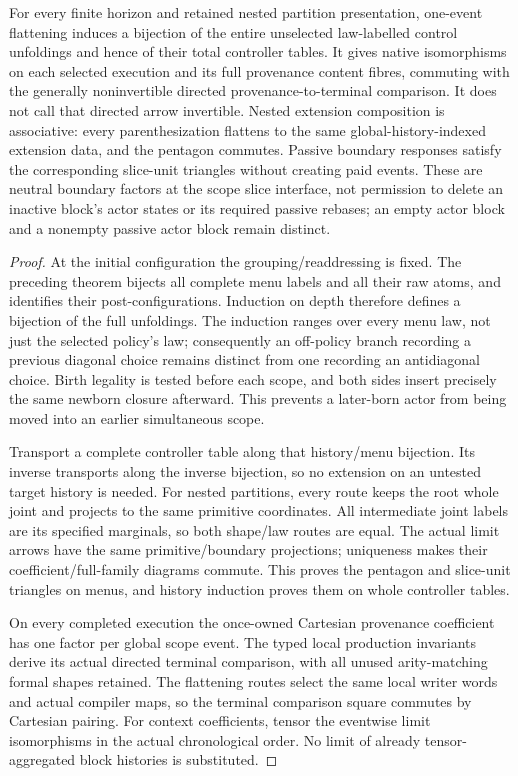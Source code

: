 \documentclass[11pt]{article}
\begin{document}
\begin{theorem}
For every finite horizon and retained nested partition presentation, one-event flattening induces a bijection of the entire unselected law-labelled control unfoldings and hence of their total controller tables. It gives native isomorphisms on each selected execution and its full provenance content fibres, commuting with the generally noninvertible directed provenance-to-terminal comparison. It does not call that directed arrow invertible. Nested extension composition is associative: every parenthesization flattens to the same global-history-indexed extension data, and the pentagon commutes. Passive boundary responses satisfy the corresponding slice-unit triangles without creating paid events. These are neutral boundary factors at the scope slice interface, not permission to delete an inactive block's actor states or its required passive rebases; an empty actor block and a nonempty passive actor block remain distinct.
\end{theorem}
\begin{proof}
At the initial configuration the grouping/readdressing is fixed. The preceding theorem bijects all complete menu labels and all their raw atoms, and identifies their post-configurations. Induction on depth therefore defines a bijection of the full unfoldings. The induction ranges over every menu law, not just the selected policy's law; consequently an off-policy branch recording a previous diagonal choice remains distinct from one recording an antidiagonal choice. Birth legality is tested before each scope, and both sides insert precisely the same newborn closure afterward. This prevents a later-born actor from being moved into an earlier simultaneous scope.

Transport a complete controller table along that history/menu bijection. Its inverse transports along the inverse bijection, so no extension on an untested target history is needed. For nested partitions, every route keeps the root whole joint and projects to the same primitive coordinates. All intermediate joint labels are its specified marginals, so both shape/law routes are equal. The actual limit arrows have the same primitive/boundary projections; uniqueness makes their coefficient/full-family diagrams commute. This proves the pentagon and slice-unit triangles on menus, and history induction proves them on whole controller tables.

On every completed execution the once-owned Cartesian provenance coefficient has one factor per global scope event. The typed local production invariants derive its actual directed terminal comparison, with all unused arity-matching formal shapes retained. The flattening routes select the same local writer words and actual compiler maps, so the terminal comparison square commutes by Cartesian pairing. For context coefficients, tensor the eventwise limit isomorphisms in the actual chronological order. No limit of already tensor-aggregated block histories is substituted.\end{proof}
\end{document}
